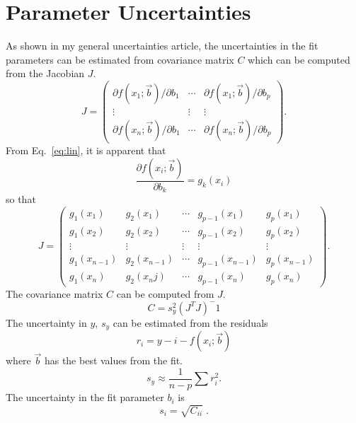 \documentclass{scrartcl}
\begin{document}
\section{Parameter Uncertainties}\label{sec:uncert}
As shown in my general uncertainties article\cite{uncertainties},
the uncertainties in the fit parameters can be estimated from
covariance matrix $C$ which can be computed from the Jacobian
$J$.
\begin{equation}
J = \left(\begin{array}{ccc}
\partial f(x_1;\vec{b})/\partial b_1& \cdots &
	\partial f(x_1;\vec{b})/\partial b_p\\
\vdots & \vdots & \vdots \\
\partial f(x_n; \vec{b})/\partial b_1 & \cdots  &
	\partial f(x_n;\vec{b})/\partial b_p
\end{array}\right).
\end{equation}
From Eq.~\ref{eq:lin}, it is apparent that
\begin{equation}
\frac{\partial f(x_i;\vec{b})}{\partial b_k} = g_k(x_i)
\end{equation}
so that
\begin{equation}
J = \left(\begin{array}{ccccc}
g_1(x_1)&g_2(x_1)& \cdots & g_{p-1}(x_1)& g_p(x_1)\\
g_1(x_2)&g_2(x_2)& \cdots & g_{p-1}(x_2)& g_p(x_2)\\
\vdots & \vdots & \vdots & \vdots & \vdots\\
g_1(x_{n-1}) & g_2(x_{n-1}) & \cdots & g_{p-1}(x_{n-1}) & g_p(x_{n-1})\\
g_1(x_n) & g_2(x_nj) & \cdots & g_{p-1}(x_n) & g_p(x_n)
\end{array}\right).
\end{equation}
The covariance matrix $C$ can be computed from $J$.
\begin{equation}
C = s_y^2(J^{T}J)^-1
\end{equation}
The uncertainty in $y$, $s_y$ can be estimated from the residuals
\begin{equation}
r_i = y-i - f(x_i;\vec{b})
\end{equation}
where $\vec{b}$ has the best values from the fit.
\begin{equation}
s_y \approx \frac{1}{n-p}\sum r_i^2.
\end{equation}
The uncertainty in the fit parameter $b_i$ is
\begin{equation}
s_i = \sqrt{C_{ii}}\;.
\end{equation}
\end{document}
